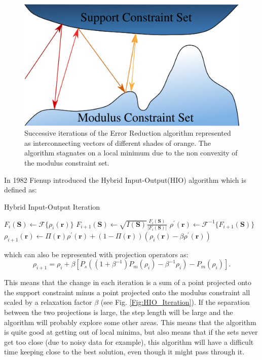 \begin{figure}[h]
\centering
  \includegraphics[width=0.8 \columnwidth]{Image_Reconstruction/Stagnation.png}
  \caption{Successive iterations of the Error Reduction algorithm represented as interconnecting
    vectors of different shades of orange. The algorithm stagnates on a local minimum due
    to the non convexity of the modulus constraint set.}
  \label{Fig:Stagnation}
\end{figure}

In 1982 Fienup introduced the Hybrid Input-Output(HIO) algorithm \cite{Fienup1982Phase}
which is defined as:
\begin{algorithm}
\caption{Hybrid Input-Output Iteration}
\begin{algorithmic}
  \STATE $F_{i}(\mathbf S) \gets \mathscr{F}\{\rho_i(\mathbf r)\}$
  \STATE $F_{i+1}(\mathbf S) \gets \sqrt{I(\mathbf S)} \frac{F_i(\mathbf
    S)}{|F_i(\mathbf S)|}$
  \STATE $\rho^{\prime}(\mathbf r) \gets \mathscr{F}^{-1}\{F_{i+1}(\mathbf S)\}$
  \STATE $\rho_{i+1}(\mathbf r) \gets \Pi(\mathbf r) \rho^{\prime}(\mathbf r) +
  (1-\Pi(\mathbf r)) (\rho_i(\mathbf r)-\beta \rho^{\prime}(\mathbf r))$
\end{algorithmic}
\end{algorithm}

which can also be represented with projection operators
\cite{Thibault2007Algorithmic} as:
\begin{equation}
  \rho_{i+1} = \rho_{i} + \beta\left[P_s((1+\beta^{-1})P_m(\rho_i)-\beta^{-1}
    \rho_{i}) -P_m(\rho_i)\right] .
\end{equation}

This means that the change in each iteration is a sum of a point projected onto the
support constraint minus a point projected onto the modulus constraint all
scaled by a relaxation factor $\beta$ (see Fig. \ref{Fig:HIO_Iteration}). If the
separation between the two 
projections is large, the step length will be large and the algorithm will
probably explore some other areas. This means that the algorithm is quite good
at getting out of local minima, but also means that if the sets never get too
close (due to noisy data for example), this algorithm will have a difficult time
keeping close to the best solution, even though it might pass through it.

